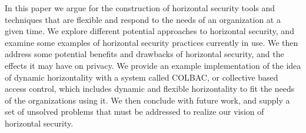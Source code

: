 In this paper we argue for the construction of horizontal security tools and
techniques that are flexible and respond to the needs of an organization at a
given time. We explore different potential approaches to horizontal security,
and examine some examples of horizontal security practices currently in use. We
then address some potential benefits and drawbacks of horizontal security, and
the effects it may have on privacy. We provide an example implementation of the
idea of dynamic horizontality with a system called COLBAC, or collective based
access control, which includes dynamic and flexible horizontality to fit the
needs of the organizations using it. We then conclude with future work, and
supply a set of unsolved problems that must be addressed to realize our vision
of horizontal security.
